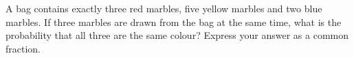 A bag contains exactly three red marbles, five yellow marbles and two blue marbles. If three marbles are drawn from the bag at the same time, what is the probability that all three are the same colour? Express your answer as a common fraction.
